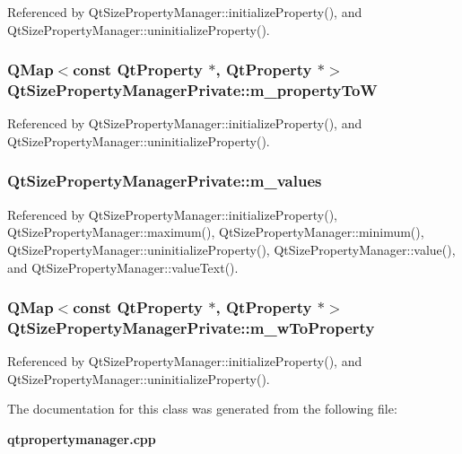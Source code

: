 Referenced by Qt\+Size\+Property\+Manager\+::initialize\+Property(), and Qt\+Size\+Property\+Manager\+::uninitialize\+Property().

\subsubsection[{m\+\_\+property\+ToW}]{\setlength{\rightskip}{0pt plus 5cm}Q\+Map$<$const {\bf Qt\+Property} $\ast$, {\bf Qt\+Property} $\ast$$>$ Qt\+Size\+Property\+Manager\+Private\+::m\+\_\+property\+ToW}\label{classQtSizePropertyManagerPrivate_aaf27868c878cb12def1e5c778662eebb}


Referenced by Qt\+Size\+Property\+Manager\+::initialize\+Property(), and Qt\+Size\+Property\+Manager\+::uninitialize\+Property().

\subsubsection[{m\+\_\+values}]{ Qt\+Size\+Property\+Manager\+Private\+::m\+\_\+values}\label{classQtSizePropertyManagerPrivate_ac147fdc10704437490462f61ac0f018d}


Referenced by Qt\+Size\+Property\+Manager\+::initialize\+Property(), Qt\+Size\+Property\+Manager\+::maximum(), Qt\+Size\+Property\+Manager\+::minimum(), Qt\+Size\+Property\+Manager\+::uninitialize\+Property(), Qt\+Size\+Property\+Manager\+::value(), and Qt\+Size\+Property\+Manager\+::value\+Text().

\subsubsection[{m\+\_\+w\+To\+Property}]{\setlength{\rightskip}{0pt plus 5cm}Q\+Map$<$const {\bf Qt\+Property} $\ast$, {\bf Qt\+Property} $\ast$$>$ Qt\+Size\+Property\+Manager\+Private\+::m\+\_\+w\+To\+Property}\label{classQtSizePropertyManagerPrivate_ae9c18e390dc5aaff574f3d8b77053aba}


Referenced by Qt\+Size\+Property\+Manager\+::initialize\+Property(), and Qt\+Size\+Property\+Manager\+::uninitialize\+Property().



The documentation for this class was generated from the following file\+:\begin{DoxyCompactItemize}
\item 
{\bf qtpropertymanager.\+cpp}\end{DoxyCompactItemize}
